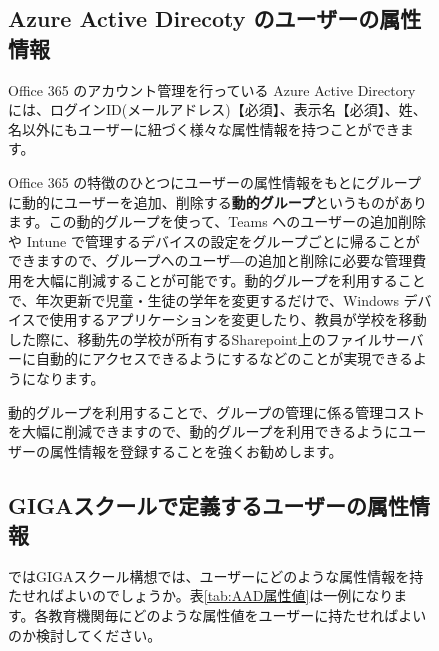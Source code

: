 \begin{figure}[]
    \subsection{Azure Active Direcoty のユーザーの属性情報}

    \hspace{8pt} Office 365 のアカウント管理を行っている Azure Active Directory には、ログインID(メールアドレス)【必須】、表示名【必須】、姓、名以外にもユーザーに紐づく様々な属性情報を持つことができます。

    \hspace{8pt} Office 365 の特徴のひとつにユーザーの属性情報をもとにグループに動的にユーザーを追加、削除する\textbf{動的グループ}というものがあります。この動的グループを使って、Teams へのユーザーの追加削除や Intune で管理するデバイスの設定をグループごとに帰ることができますので、グループへのユーザ―の追加と削除に必要な管理費用を大幅に削減することが可能です。動的グループを利用することで、年次更新で児童・生徒の学年を変更するだけで、Windows デバイスで使用するアプリケーションを変更したり、教員が学校を移動した際に、移動先の学校が所有するSharepoint上のファイルサーバーに自動的にアクセスできるようにするなどのことが実現できるようになります。

    \hspace{8pt} 動的グループを利用することで、グループの管理に係る管理コストを大幅に削減できますので、動的グループを利用できるようにユーザーの属性情報を登録することを強くお勧めします。
\end{figure}
\vspace{6cm}




\begin{figure}[]
    \subsection{GIGAスクールで定義するユーザーの属性情報}

    \hspace{8pt} ではGIGAスクール構想では、ユーザーにどのような属性情報を持たせればよいのでしょうか。表\ref{tab:AAD属性値}は一例になります。各教育機関毎にどのような属性値をユーザーに持たせればよいのか検討してください。
\end{figure}


